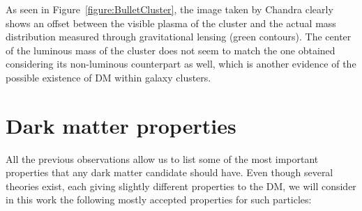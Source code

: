 \documentclass[a4paper, 10pt, openright]{report}
\begin{document}
As seen in Figure~\ref{figure:BulletCluster}, the image taken by Chandra clearly shows an offset between the visible plasma of the cluster and the actual mass distribution measured through gravitational lensing (green contours). The center of the luminous mass of the cluster does not seem to match the one obtained considering its non-luminous counterpart as well, which is another evidence of the possible existence of \ac{DM} within galaxy clusters.

\section{Dark matter properties} \label{section:DMProperties}

All the previous observations allow us to list some of the most important properties that any dark matter candidate should have. Even though several theories exist, each giving slightly different properties to the \ac{DM}, we will consider in this work the following mostly accepted properties for such particles:
\end{document}
